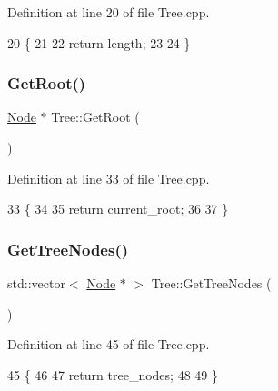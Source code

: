 Definition at line 20 of file Tree.\+cpp.


\begin{DoxyCode}
20                      \{
21   
22   \textcolor{keywordflow}{return} length;
23   
24 \}
\end{DoxyCode}
\mbox{\label{classTree_a866593b4b067b38394a090e0d57b132f}} 
\subsubsection{\texorpdfstring{Get\+Root()}{GetRoot()}}
{\footnotesize\ttfamily \hyperlink{classNode}{Node} $\ast$ Tree\+::\+Get\+Root (\begin{DoxyParamCaption}{ }\end{DoxyParamCaption})}



Definition at line 33 of file Tree.\+cpp.


\begin{DoxyCode}
33                    \{
34   
35   \textcolor{keywordflow}{return} current\_root;
36   
37 \}
\end{DoxyCode}
\mbox{\label{classTree_a390ab7f66c8c33fe6780a372263d6d38}} 
\subsubsection{\texorpdfstring{Get\+Tree\+Nodes()}{GetTreeNodes()}}
{\footnotesize\ttfamily std\+::vector$<$ \hyperlink{classNode}{Node} $\ast$ $>$ Tree\+::\+Get\+Tree\+Nodes (\begin{DoxyParamCaption}{ }\end{DoxyParamCaption})}



Definition at line 45 of file Tree.\+cpp.


\begin{DoxyCode}
45                                    \{
46   
47   \textcolor{keywordflow}{return} tree\_nodes;
48   
49 \}
\end{DoxyCode}
\mbox{\label{classTree_aefee00842552e70746a5ed1fdca4f91f}} 

